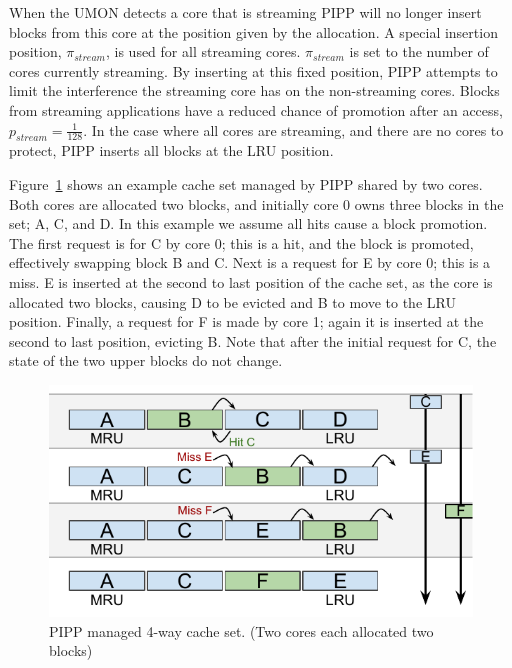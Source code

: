 When the UMON detects a core that is streaming PIPP will no longer insert blocks from this core at the position given by the allocation.
A special insertion position, $\pi_{stream}$, is used for all streaming cores.
$\pi_{stream}$ is set to the number of cores currently streaming. 
By inserting at this fixed position, PIPP attempts to limit the interference the streaming core has on the non-streaming cores.
Blocks from streaming applications have a reduced chance of promotion after an access, $p_{stream} = \frac{1}{128}$.
In the case where all cores are streaming, and there are no cores to protect, PIPP inserts all blocks at the LRU position.

Figure~\ref{fig:algorithms:pipp_example} shows an example cache set managed by PIPP shared by two cores.
Both cores are allocated two blocks, and initially core 0 owns three blocks in the set; A, C, and D.
In this example we assume all hits cause a block promotion.
The first request is for C by core 0; this is a hit, and the block is promoted, effectively swapping block B and C.
Next is a request for E by core 0; this is a miss.
E is inserted at the second to last position of the cache set, as the core is allocated two blocks, causing D to be evicted and B to move to the LRU position.
Finally, a request for F is made by core 1; again it is inserted at the second to last position, evicting B.
Note that after the initial request for C, the state of the two upper blocks do not change.

\begin{figure}[ht]
    \centering
    \includegraphics[width=.65\textwidth]{figures/algorithms/PIPP}
    \caption[PIPP managed 4-way cache set.]{PIPP managed 4-way cache set. (Two cores each allocated two blocks)}
    \label{fig:algorithms:pipp_example}
\end{figure}